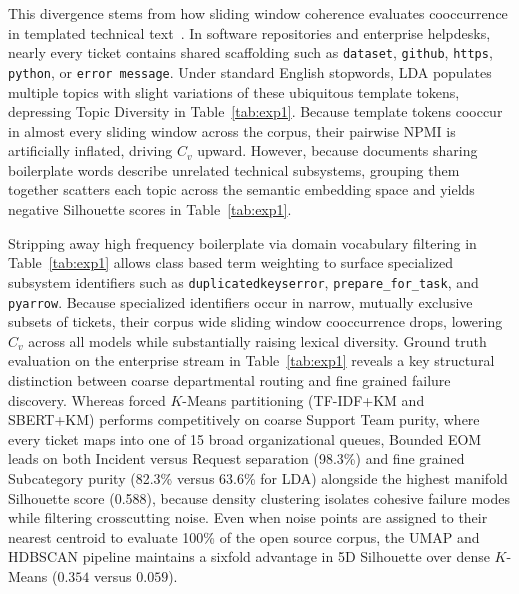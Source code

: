 \documentclass[sigconf,anonymous,pbalance]{acmart}
\begin{document}
This divergence stems from how sliding window coherence evaluates cooccurrence in templated technical text~\cite{hoyle2021automated}. In software repositories and enterprise helpdesks, nearly every ticket contains shared scaffolding such as \texttt{dataset}, \texttt{github}, \texttt{https}, \texttt{python}, or \texttt{error message}. Under standard English stopwords, LDA populates multiple topics with slight variations of these ubiquitous template tokens, depressing Topic Diversity in Table~\ref{tab:exp1}. Because template tokens cooccur in almost every sliding window across the corpus, their pairwise NPMI is artificially inflated, driving $C_v$ upward. However, because documents sharing boilerplate words describe unrelated technical subsystems, grouping them together scatters each topic across the semantic embedding space and yields negative Silhouette scores in Table~\ref{tab:exp1}.

Stripping away high frequency boilerplate via domain vocabulary filtering in Table~\ref{tab:exp1} allows class based term weighting to surface specialized subsystem identifiers such as \texttt{duplicated\-keys\-error}, \texttt{prepare\_for\_task}, and \texttt{pyarrow}. Because specialized identifiers occur in narrow, mutually exclusive subsets of tickets, their corpus wide sliding window cooccurrence drops, lowering $C_v$ across all models while substantially raising lexical diversity. Ground truth evaluation on the enterprise stream in Table~\ref{tab:exp1} reveals a key structural distinction between coarse departmental routing and fine grained failure discovery. Whereas forced $K$-Means partitioning (TF-IDF+KM and SBERT+KM) performs competitively on coarse Support Team purity, where every ticket maps into one of 15 broad organizational queues, Bounded EOM leads on both Incident versus Request separation (98.3\%) and fine grained Subcategory purity (82.3\% versus 63.6\% for LDA) alongside the highest manifold Silhouette score (0.588), because density clustering isolates cohesive failure modes while filtering crosscutting noise. Even when noise points are assigned to their nearest centroid to evaluate 100\% of the open source corpus, the UMAP and HDBSCAN pipeline maintains a sixfold advantage in 5D Silhouette over dense $K$-Means ($0.354$ versus $0.059$).
\end{document}
